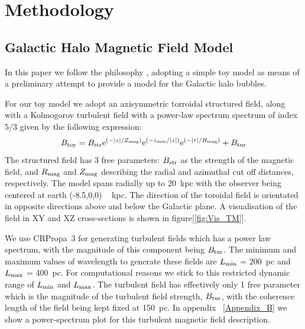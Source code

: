 \documentclass[12pt, a4 paper]{article}
\begin{document}
\section{Methodology}
\label{Methods}

\subsection{Galactic Halo Magnetic Field Model}
\label{GMF}
In this paper we follow the philosophy \cite{West_Helicity}, adopting a simple toy model as means of a preliminary attempt to provide a model for the Galactic halo bubbles. 

For our toy model we adopt an axisymmetric torroidal structured field, along with a Kolmogorov turbulent field with a power-law spectrum spectrum of index $5/3$ given by the following expression:
\begin{equation}\label{TM_equation}
        B_{\mathrm{toy}}= B_{\rm{str}}\mathrm{e}^{{(-\abs{{z}}/Z_{{\mathrm{mag}}})}} \mathrm{e}^{{(-z_{{\mathrm{min}}}/\abs{{z}})}}\mathrm{e}^{{(-\abs{{r}}/R_{{\mathrm{mag}}})}} + B_{\rm{tur}}
\end{equation}
The structured field has 3 free parameters: $B_{\rm str}$ as the strength of the magnetic field, and $R_{\rm {mag}}$ and $Z_{\rm {mag}}$ describing the radial and azimuthal cut off distances, respectively. The model spans radially up to 20~kpc with the observer being centered at earth (-8.5,0,0) ~ kpc. The direction of the toroidal field is orientated in opposite directions above and below the Galactic plane. A visualisation of the field in XY and XZ cross-sections is shown in figure[\ref{fig:Vis_TM}]. 

We use CRPropa~3 \cite{CRPropa3_2016} for generating turbulent fields which has a power law spectrum, with the magnitude of this component being $B_{\rm{tur}}$. 
The minimum and maximum values of wavelength to generate these fields are  $L_{\rm min}$ = 200~pc and $L_{\rm max}$ = 400~pc. For computational reasons we stick to this restricted dynamic range of $L_{\rm min}$ and $L_{\rm max}$. The turbulent field has effectively only 1 free parameter which is the magnitude of the turbulent field strength, $ B_{\rm tur}$, with the coherence length of the field being kept fixed at 150~pc.  In appendix ~\ref{Appendix_B} we show a power-spectrum plot for this turbulent magnetic field description.
\end{document}
